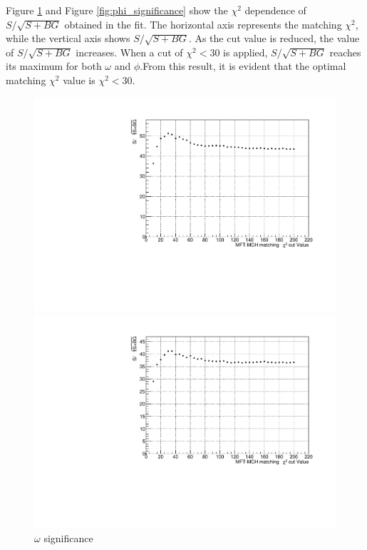             Figure \ref{fig:omega_significance} and Figure \ref{fig:phi_significance} show the $\chi^2$ dependence of \(S/\sqrt{S+BG}\) obtained in the fit.
            The horizontal axis represents the matching \(\chi^2\), while the vertical axis shows \(S/\sqrt{S+BG}\). As the cut value is reduced, the value of \(S/\sqrt{S+BG}\) increases. When a cut of \(\chi^2 < 30\) is applied, \(S/\sqrt{S+BG}\) reaches its maximum for both \(\omega\) and \(\phi\).\@ From this result, it is evident that the optimal matching \(\chi^2\) value is \(\chi^2 < 30\).\@
            \begin{figure}[htbp]
                \centering
                \begin{minipage}{0.45\textwidth} %
                    \centering
                    \includegraphics[width=\textwidth]{fig/3_4_4_omega_significance.pdf} %
                    \caption{$\omega$ significance}
                    \label{fig:omega_significance}
                \end{minipage}
                \hfill
                \begin{minipage}{0.45\textwidth}
                    \centering
                    \includegraphics[width=\textwidth]{fig/3_4_4_phi_significance.pdf} %

\end{minipage}
\end{figure}
